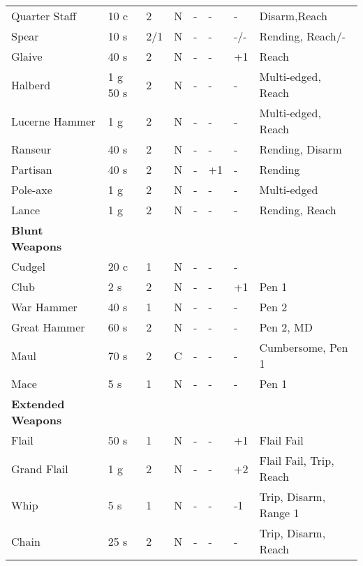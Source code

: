 \begin{table}[ht!]
\begin{tabular}{|l|l|l|l|l|l|l|l|}
		Quarter Staff & 10 c & 2 &  N & - & - & - & Disarm,Reach\\
		Spear & 10 s & 2/1 & N & - & - & -/- & Rending, Reach/- \\
		Glaive & 40 s & 2 & N & - & - & +1 & Reach \\
		Halberd & 1 g 50 s & 2 & N & - & - & - & Multi-edged, Reach\\
		Lucerne Hammer & 1 g & 2 & N & - & - & - & Multi-edged, Reach\\ 
		Ranseur & 40 s & 2 & N & - & - & - & Rending, Disarm \\ 
		Partisan & 40 s & 2 & N & - & +1 & - & Rending\\
        Pole-axe & 1 g & 2 & N & - & - & - & Multi-edged \\
		Lance & 1 g & 2 & N & - & - & - & Rending, Reach\\
		\hline
		\textbf{Blunt Weapons} & & & & & & & \\
		\hline
		Cudgel & 20 c & 1  & N & - & - & - &  \\
		Club & 2 s & 2 & N & - & - & +1 & Pen 1 \\
		War Hammer & 40 s & 1 & N & - & - & - & Pen 2 \\ 
		Great Hammer & 60 s & 2 & N & - & - & - & Pen 2, MD \\
		Maul & 70 s & 2 & C & - & - & - & Cumbersome, Pen 1 \\
		Mace & 5 s & 1 & N & - & - & - & Pen 1 \\
		\hline
		\textbf{Extended Weapons} & & & & & & & \\
		\hline
		Flail & 50 s & 1 & N & - & - & +1 & Flail Fail \\ 
		Grand Flail & 1 g & 2 & N & - & - & +2 & Flail Fail, Trip, Reach \\
		Whip & 5 s & 1 & N & - & - & -1 & Trip, Disarm, Range 1\\
		Chain & 25 s & 2 & N & - & - & - & Trip, Disarm, Reach\\  
		\hline
	\end{tabular}
\end{table}
